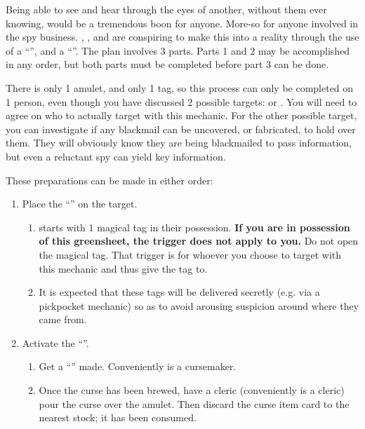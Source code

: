 \documentclass[green]{GL2020}
\begin{document}
\name{\gUnsuspectingBirdie{}}

Being able to see and hear through the eyes of another, without them ever knowing, would be a tremendous boon for anyone. More-so for anyone involved in the spy business. \cAntiChup{}, \cScholarship{}, and \cPrince{} are conspiring to make this into a reality through the use of a ``\iMagicTag{}'', and a ``\iScryingAmulet{}''. The plan involves 3 parts. Parts 1 and 2 may be accomplished in any order, but both parts must be completed before part 3 can be done.

There is only 1 amulet, and only 1 tag, so this process can only be completed on 1 person, even though you have discussed 2 possible targets: \cPirate{\full} or \cInitiate{\full}. You will need to agree on who to actually target with this mechanic. For the other possible target, you can investigate if any blackmail can be uncovered, or fabricated, to hold over them. They will obviously know they are being blackmailed to pass information, but even a reluctant spy can yield key information.

These preparations can be made in either order:
\begin{enumerate}
  \item Place the ``\iMagicTag{}'' on the target.
  \begin{enumerate}
    \item \cScholarship{} starts with 1 magical tag in their possession. \textbf{If you are in possession of this greensheet, the trigger does not apply to you.} Do not open the magical tag. That trigger is for whoever you choose to target with this mechanic and thus give the tag to.
    \item It is expected that these tags will be delivered secretly (e.g. via a pickpocket mechanic) so as to avoid arousing suspicion around where they came from.
  \end{enumerate}
  \item Activate the ``\iScryingAmulet{}''.
  \begin{enumerate}
     \item Get a ``\iBlindness{}'' made. Conveniently \cPrince{} is a cursemaker.
     \item Once the curse has been brewed, have a cleric (conveniently  \cAntiChup{} is a cleric) pour the curse over the amulet. Then discard the curse item card to the nearest stock; it has been consumed.
  \end{enumerate}
\end{enumerate}
\end{document}
